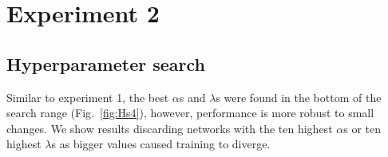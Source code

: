 

\section{Experiment 2}
\subsection{Hyperparameter search}
Similar to experiment 1, the best $\alpha$s and $\lambda$s were found in the bottom of the search range (Fig.~\ref{fig:Hs4}), however, performance is more robust to small changes. We show results discarding networks with the ten highest $\alpha$s or ten highest $\lambda$s as bigger values caused training to diverge.
